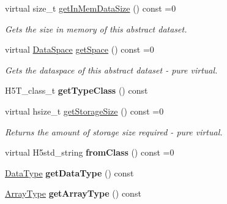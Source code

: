 \begin{DoxyCompactItemize}
virtual size\+\_\+t \hyperlink{class_h5_1_1_abstract_ds_abf03ce9861ccb7cb1b59eb3e54db253e}{get\+In\+Mem\+Data\+Size} () const =0
\begin{DoxyCompactList}\small\item\em Gets the size in memory of this abstract dataset. \end{DoxyCompactList}\item 
\mbox{\label{class_h5_1_1_abstract_ds_a3afefb3c3be0ec2efcf880361695706e}} 
virtual \hyperlink{class_h5_1_1_data_space}{Data\+Space} \hyperlink{class_h5_1_1_abstract_ds_a3afefb3c3be0ec2efcf880361695706e}{get\+Space} () const =0
\begin{DoxyCompactList}\small\item\em Gets the dataspace of this abstract dataset -\/ pure virtual. \end{DoxyCompactList}\item 
\mbox{\label{class_h5_1_1_abstract_ds_a906ad9c7af32bf15219d67b6d8234e33}} 
H5\+T\+\_\+class\+\_\+t {\bfseries get\+Type\+Class} () const
\item 
\mbox{\label{class_h5_1_1_abstract_ds_ae90e2e730c114423a00a2643206abc44}} 
virtual hsize\+\_\+t \hyperlink{class_h5_1_1_abstract_ds_ae90e2e730c114423a00a2643206abc44}{get\+Storage\+Size} () const =0
\begin{DoxyCompactList}\small\item\em Returns the amount of storage size required -\/ pure virtual. \end{DoxyCompactList}\item 
\mbox{\label{class_h5_1_1_abstract_ds_a13c2b6930fd81d9e019acc0ce21c7e55}} 
virtual H5std\+\_\+string {\bfseries from\+Class} () const =0
\item 
\mbox{\label{class_h5_1_1_abstract_ds_a67e853e4c5b57b44b540e98b46e9593a}} 
\hyperlink{class_h5_1_1_data_type}{Data\+Type} {\bfseries get\+Data\+Type} () const
\item 
\mbox{\label{class_h5_1_1_abstract_ds_a509fa31a943a8ae2350b14c702b07193}} 
\hyperlink{class_h5_1_1_array_type}{Array\+Type} {\bfseries get\+Array\+Type} () const
\item 

\end{DoxyCompactItemize}
